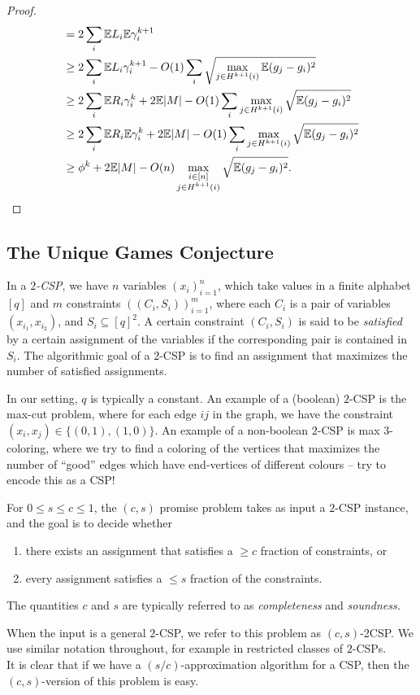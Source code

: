 \begin{proof}
\begin{align*}
				&= 2 \sum_i \mathbb{E} L_i \mathbb{E} \gamma_i^{k+1} \\
				&\ge 2 \sum_i \mathbb{E} L_i \gamma_i^{k+1} - O(1) \sum_i \sqrt{\max_{j \in H^{k+1}(i)} \mathbb{E} (g_j - g_i)^2} \\
				&\ge 2 \sum_i \mathbb{E} R_i \gamma_i^k + 2 \mathbb{E} |M| - O(1) \sum_i \max_{j \in H^{k+1}(i)} \sqrt{\mathbb{E} (g_j - g_i)^2} \\
				&\ge 2 \sum_i \mathbb{E} R_i \mathbb{E} \gamma_i^k + 2 \mathbb{E} |M| - O(1) \sum_i \max_{j \in H^{k+1}(i)} \sqrt{ \mathbb{E} (g_j - g_i)^2} \\
				&\ge \phi^{k} + 2 \mathbb{E} |M| - O(n) \max_{\substack{i \in [n] \\ j \in H^{k+1}(i)}} \sqrt{\mathbb{E} (g_j - g_i)^2}. \qedhere
		\end{align*}
	\end{proof}

\subsection{The Unique Games Conjecture}
\label{subsec:ugc}

	\begin{fdef}
		In a \emph{$2$-CSP}, we have $n$ variables $(x_i)_{i=1}^n$, which take values in a finite alphabet $[q]$ and $m$ constraints $( (C_i,S_i) )_{i=1}^m$, where each $C_i$ is a pair of variables $(x_{i_1},x_{i_2})$, and $S_i \subseteq [q]^2$. A certain constraint $(C_i,S_i)$ is said to be \emph{satisfied} by a certain assignment of the variables if the corresponding pair is contained in $S_i$. The algorithmic goal of a $2$-CSP is to find an assignment that maximizes the number of satisfied assignments.
	\end{fdef}
	In our setting, $q$ is typically a constant. An example of a (boolean) $2$-CSP is the max-cut problem, where for each edge $ij$ in the graph, we have the constraint $(x_i,x_j) \in \{(0,1),(1,0)\}$. An example of a non-boolean $2$-CSP is max $3$-coloring, where we try to find a coloring of the vertices that maximizes the number of ``good'' edges which have end-vertices of different colours -- try to encode this as a CSP!

	\begin{fdef}
		For $0 \le s \le c \le 1$, the $(c,s)$ promise problem takes as input a $2$-CSP instance, and the goal is to decide whether
		\begin{enumerate}
			\item there exists an assignment that satisfies a $\ge c$ fraction of constraints, or
			\item every assignment satisfies a $\le s$ fraction of the constraints.
		\end{enumerate}
		The quantities $c$ and $s$ are typically referred to as \emph{completeness} and \emph{soundness.}
	\end{fdef}
	When the input is a general $2$-CSP, we refer to this problem as $(c,s)$-2CSP. We use similar notation throughout, for example in restricted classes of $2$-CSPs.\\
	It is clear that if we have a $(s/c)$-approximation algorithm for a CSP, then the $(c,s)$-version of this problem is easy.\\

